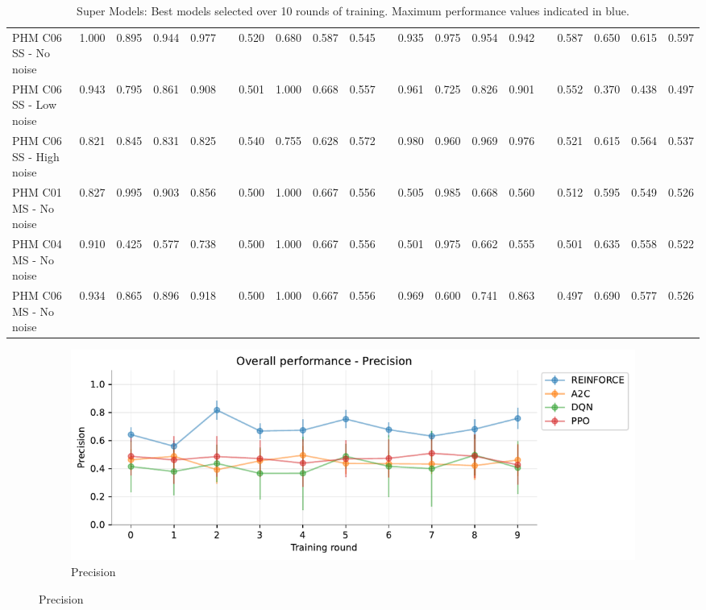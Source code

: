 \documentclass[a4paper, 12pt]{article}
\begin{document}
\begin{appendices}
\begin{landscape}
\begin{table}
\begin{tabular}{@{}l rrrr c rrrr c rrrr c rrrr@{}}
			PHM C06 SS - No noise &\textcolor{dblue}{1.000} &\textcolor{dblue}{0.895} &\textcolor{dblue}{0.944} & \textcolor{dblue}{0.977} & & 0.520 &0.680 &0.587 &0.545 & &0.935 &0.975 &0.954 &0.942 & &0.587 &0.650 &0.615&0.597\\
			PHM C06 SS - Low noise &\textcolor{dblue}{0.943} &0.795 &\textcolor{dblue}{0.861} & \textcolor{dblue}{0.908} & & 0.501 &\textcolor{dblue}{1.000} &0.668 &0.557 & &0.961 &0.725 &0.826 &0.901 & &0.552 &0.370 &0.438&0.497\\
			PHM C06 SS - High noise &0.821 &0.845 &0.831 & 0.825 & & 0.540 &0.755 &0.628 &0.572 & &\textcolor{dblue}{0.980} &\textcolor{dblue}{0.960}&\textcolor{dblue}{0.969} &\textcolor{dblue}{0.976} & &0.521 &0.615 &0.564&0.537\\\midrule
			
			PHM C01 MS - No noise &\textcolor{dblue}{0.827} &0.995 &\textcolor{dblue}{0.903} & \textcolor{dblue}{0.856} & & 0.500 &\textcolor{dblue}{1.000} &0.667 &0.556 & &0.505 &0.985 &0.668 &0.560 & &0.512 &0.595 &0.549&0.526\\
			PHM C04 MS - No noise &\textcolor{dblue}{0.910}&0.425 &0.577 & \textcolor{dblue}{0.738} & & 0.500 &\textcolor{dblue}{1.000} &\textcolor{dblue}{0.667} &0.556 & &0.501 &0.975 &0.662 &0.555 & &0.501 &0.635 &0.558&0.522\\
			PHM C06 MS - No noise &\textcolor{dblue}{0.934} &0.865 &\textcolor{dblue}{0.896} & \textcolor{dblue}{0.918} & & 0.500 &\textcolor{dblue}{1.000} &0.667 &0.556 & &0.969 &0.600 &0.741 &0.863 & &0.497 &0.690 &0.577&0.526\\			
			\bottomrule
		\end{tabular}
		\caption{Super Models: Best models selected over 10 rounds of training. Maximum performance values indicated in   \textcolor{dblue}{blue}.}
		\label{tbl:SuperModelsDetailedMetrics}
	\end{table}
\end{landscape}
\restoregeometry 
{}

\begin{figure}[h]
	\begin{subfigure}{\textwidth}
		\centering
		\includegraphics[width=\linewidth]{Overall_Pr.pdf}  
		\caption{Precision}
		\label{fig:tr-ovr-pr}
	\end{subfigure} \par\smallskip
	

\end{figure}
\end{appendices}
\end{document}
